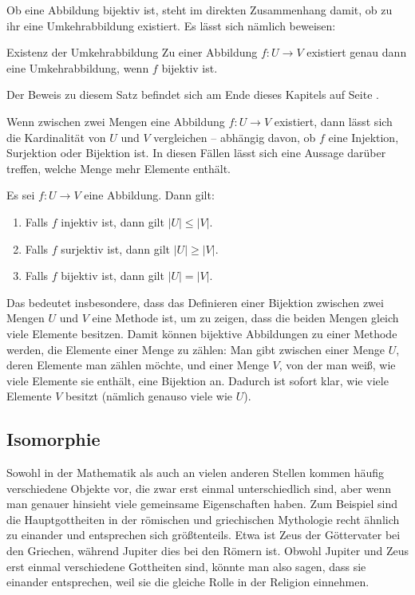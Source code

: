 \documentclass[../../main.tex]{subfiles}
\begin{document}
Ob eine Abbildung bijektiv ist, steht im direkten Zusammenhang damit, ob zu ihr eine Umkehrabbildung existiert. Es lässt sich nämlich beweisen:

\begin{theorem}{Existenz der Umkehrabbildung}
    Zu einer Abbildung $f\colon U\rightarrow V$ existiert genau dann eine Umkehrabbildung, wenn $f$ bijektiv ist.
\end{theorem}

Der Beweis zu diesem Satz befindet sich am Ende dieses Kapitels auf Seite \pageref{proof:existenceOfInverseMap}.

Wenn zwischen zwei Mengen eine Abbildung $f\colon U\rightarrow V$ existiert, dann lässt sich die Kardinalität von $U$ und $V$ vergleichen -- abhängig davon, ob $f$ eine Injektion, Surjektion oder Bijektion ist. In diesen Fällen lässt sich eine Aussage darüber treffen, welche Menge mehr Elemente enthält.

\begin{theorem}{}
    Es sei $f\colon U\rightarrow V$ eine Abbildung. Dann gilt:
    \begin{enumerate}
        \item Falls $f$ injektiv ist, dann gilt $|U|\leq |V|$.
        \item Falls $f$ surjektiv ist, dann gilt $|U|\geq |V|$.
        \item Falls $f$ bijektiv ist, dann gilt $|U|=|V|$.
    \end{enumerate}
\end{theorem}

Das bedeutet insbesondere, dass das Definieren einer Bijektion zwischen zwei Mengen $U$ und $V$ eine Methode ist, um zu zeigen, dass die beiden Mengen gleich viele Elemente besitzen. Damit können bijektive Abbildungen zu einer Methode werden, die Elemente einer Menge zu zählen: Man gibt zwischen einer Menge $U$, deren Elemente man zählen möchte, und einer Menge $V$, von der man weiß, wie viele Elemente sie enthält, eine Bijektion an. Dadurch ist sofort klar, wie viele Elemente $V$ besitzt (nämlich genauso viele wie $U$).

\subsection*{Isomorphie}
Sowohl in der Mathematik als auch an vielen anderen Stellen kommen häufig verschiedene Objekte vor, die zwar erst einmal unterschiedlich sind, aber wenn man genauer hinsieht viele gemeinsame Eigenschaften haben. Zum Beispiel sind die Hauptgottheiten in der römischen und griechischen Mythologie recht ähnlich zu einander und entsprechen sich größtenteils. Etwa ist Zeus der Göttervater bei den Griechen, während Jupiter dies bei den Römern ist. Obwohl Jupiter und Zeus erst einmal verschiedene Gottheiten sind, könnte man also sagen, dass sie einander entsprechen, weil sie die gleiche Rolle in der Religion einnehmen.
\end{document}
